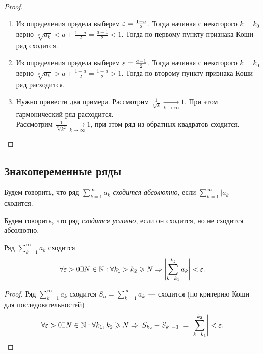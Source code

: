 \documentclass[../main.tex]{subfiles}
\begin{document}
\begin{proof}
  \begin{enumerate}
    \item Из определения предела выберем $\varepsilon = \frac{1-a}{2}$. Тогда начиная с некоторого $k = k_0$ верно $\sqrt[k]{a_k } < a + \frac{1-a}{2} = \frac{a+1}{2} < 1$. Тогда по первому пункту признака Коши ряд сходится.
    \item Из определения предела выберем $\varepsilon = \frac{a - 1}{2}$. Тогда начиная с некоторого $k = k_0$ верно $\sqrt[k]{a_k} > a + \frac{1-a}{2} = \frac{1+a}{2} > 1$. Тогда по второму пункту признака Коши ряд расходится. 
    \item Нужно привести два примера. Рассмотрим $\frac{1}{\sqrt[k]{k}}  \xrightarrow[k \to  \infty ]{} 1 $. При этом гармонический ряд расходится. \\ Рассмотрим $\frac{1}{\sqrt[k]{k^{2}}}  \xrightarrow[k \to  \infty ]{} 1 $, при этом ряд из обратных квадратов сходится.
  \end{enumerate}
\end{proof}

\subsection{Знакопеременные ряды}


\begin{definition}
  Будем говорить, что ряд $ \sum_{k=1}^{\infty} a_k $  \emph{сходится абсолютно}, если $ \sum_{k=1}^{\infty} \left| a_k \right|  $ сходится.
\end{definition}

\begin{definition}
  Будем говорить, что ряд \emph{сходится условно}, если он сходится, но не сходится абсолютно.
\end{definition}


\begin{proposition}
  Ряд $ \sum_{k=1}^{\infty} a_k $ сходится \nas 
  \begin{gather} 
    \forall \varepsilon > 0 \exists N \in \mathbb{N} : \forall k_1 > k_2 \geqslant N \Rightarrow \left| \sum_{k=k_1 }^{k_2 } a_k  \right| < \varepsilon  .
  \end{gather}
\end{proposition}


\begin{proof}
  Ряд $ \sum_{k=1}^{\infty} a_k $ сходится \nas $S_n = \sum_{k=1}^{\infty} a_k $~--- сходится \nas (по критерию Коши для последовательностей) 
  \begin{gather} 
    \forall \varepsilon > 0 \exists N \in \mathbb{N} : \forall k_1, k_2 \geqslant N \Rightarrow \left| S_{k_2 }  - S_{k_1-1 }\right| = \left| \sum_{k=k_1 }^{k_2 } \right|  < \varepsilon.
  \end{gather} 
\end{proof}
\end{document}
